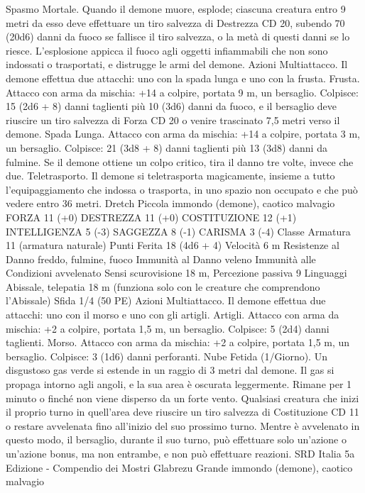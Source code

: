 \begin{multicols}{2}
Spasmo Mortale. Quando il demone muore, esplode; ciascuna
creatura entro 9 metri da esso deve effettuare un tiro salvezza di
Destrezza CD 20, subendo 70 (20d6) danni da fuoco se fallisce il
tiro salvezza, o la metà di questi danni se lo riesce. L’esplosione
appicca il fuoco agli oggetti infiammabili che non sono indossati
o trasportati, e distrugge le armi del demone.
Azioni
Multiattacco. Il demone effettua due attacchi: uno con la spada
lunga e uno con la frusta.
Frusta. Attacco con arma da mischia: +14 a colpire, portata 9 m,
un bersaglio.
Colpisce: 15 (2d6 + 8) danni taglienti più 10 (3d6) danni da
fuoco, e il bersaglio deve riuscire un tiro salvezza di Forza CD
20 o venire trascinato 7,5 metri verso il demone.
Spada Lunga. Attacco con arma da mischia: +14 a colpire,
portata 3 m, un bersaglio.
Colpisce: 21 (3d8 + 8) danni taglienti più 13 (3d8) danni da
fulmine. Se il demone ottiene un colpo critico, tira il danno tre
volte, invece che due.
Teletrasporto. Il demone si teletrasporta magicamente, insieme a
tutto l’equipaggiamento che indossa o trasporta, in uno spazio
non occupato e che può vedere entro 36 metri.
Dretch
Piccola immondo (demone), caotico malvagio
FORZA 11 (+0)
DESTREZZA 11 (+0)
COSTITUZIONE 12 (+1)
INTELLIGENZA 5 (-3)
SAGGEZZA 8 (-1)
CARISMA 3 (-4)
Classe Armatura 11 (armatura naturale)
Punti Ferita 18 (4d6 + 4)
Velocità 6 m
Resistenze al Danno freddo, fulmine, fuoco
Immunità al Danno veleno
Immunità alle Condizioni avvelenato
Sensi scurovisione 18 m, Percezione passiva 9
Linguaggi Abissale, telepatia 18 m (funziona solo con le
creature che comprendono l’Abissale)
Sfida 1/4 (50 PE)
Azioni
Multiattacco. Il demone effettua due attacchi: uno con il morso e
uno con gli artigli.
Artigli. Attacco con arma da mischia: +2 a colpire, portata 1,5
m, un bersaglio.
Colpisce: 5 (2d4) danni taglienti.
Morso. Attacco con arma da mischia: +2 a colpire, portata 1,5
m, un bersaglio.
Colpisce: 3 (1d6) danni perforanti.
Nube Fetida (1/Giorno). Un disgustoso gas verde si estende in
un raggio di 3 metri dal demone. Il gas si propaga intorno agli
angoli, e la sua area è oscurata leggermente. Rimane per 1
minuto o finché non viene disperso da un forte vento. Qualsiasi
creatura che inizi il proprio turno in quell’area deve riuscire un
tiro salvezza di Costituzione CD 11 o restare avvelenata fino
all’inizio del suo prossimo turno. Mentre è avvelenato in questo
modo, il bersaglio, durante il suo turno, può effettuare solo
un’azione o un’azione bonus, ma non entrambe, e non può
effettuare reazioni. 
SRD Italia 5a Edizione - Compendio dei Mostri
Glabrezu
Grande immondo (demone), caotico malvagio

\end{multicols}
